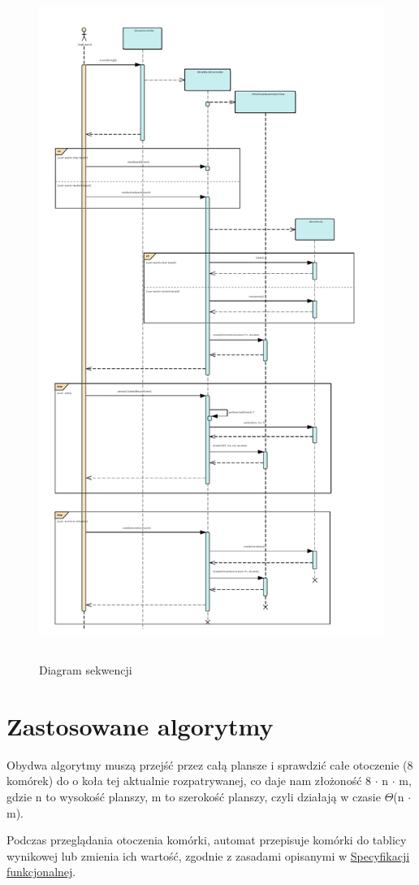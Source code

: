 \documentclass{report}
\begin{document}
\begin{figure}
	\centering
	\vspace{-4cm}
	\includegraphics[height=22cm]{Diagram_Sekwencji_Narysowanie_automatu_ww_symulacja_kilku_stanow}
	\caption{Diagram sekwencji}
	\label{fig:baisicWWSequense}
\end{figure}

\section{Zastosowane algorytmy}
\begin{samepage}
	Obydwa algorytmy muszą przejść przez całą plansze i sprawdzić całe otoczenie (8 komórek) do o koła tej aktualnie rozpatrywanej, co daje nam złożoność 8 $\cdot$ n $\cdot$ m, gdzie n to wysokość planszy, m to szerokość planszy, czyli działają w czasie $\Theta$(n $\cdot$ m).

	Podczas przeglądania otoczenia komórki, automat przepisuje komórki do tablicy wynikowej lub zmienia ich wartość, zgodnie z zasadami opisanymi w \href{https://github.com/boguszj/Wire-world/blob/master/Specyfikacja-funkcjonalna/Specyfikacja-funkcjonalna.pdf}{Specyfikacji funkcjonalnej}.
\end{samepage}
\end{document}
